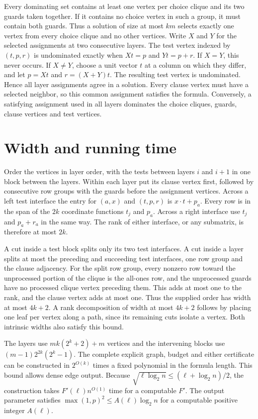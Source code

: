 \documentclass[11pt]{article}
\begin{document}
Every dominating set contains at least one vertex per choice clique and
its two guards taken together. If it contains no choice vertex in such
a group, it must contain both guards. Thus a solution of size at most
$km$ selects exactly one vertex from every choice clique and no other
vertices. Write $X$ and $Y$ for the selected assignments at two consecutive
layers. The test vertex indexed by $(t,p,r)$ is undominated exactly when
$Xt=p$ and $Yt=p+r$. If $X=Y$, this never occurs. If $X\ne Y$, choose a
unit vector $t$ at a column on which they differ, and let $p=Xt$ and
$r=(X+Y)t$. The resulting test vertex is undominated. Hence all layer
assignments agree in a solution. Every clause vertex must have a selected
neighbor, so this common assignment satisfies the formula. Conversely, a
satisfying assignment used in all layers dominates the choice cliques,
guards, clause vertices and test vertices.

\section{Width and running time}

Order the vertices in layer order, with the tests between layers $i$ and
$i+1$ in one block between the layers. Within each layer put its clause
vertex first, followed by consecutive row groups with the guards before
the assignment vertices. Across a left test interface the entry for
$(a,x)$ and $(t,p,r)$ is $x\cdot t+p_a$. Every row is in the span of the
$2k$ coordinate functions $t_j$ and $p_a$. Across a right interface use
$t_j$ and $p_a+r_a$ in the same way. The rank of either interface, or any
submatrix, is therefore at most $2k$.

A cut inside a test block splits only its two test interfaces. A cut
inside a layer splits at most the preceding and succeeding test interfaces,
one row group and the clause adjacency. For the split row group, every
nonzero row toward the unprocessed portion of the clique is the all-ones
row, and the unprocessed guards have no processed clique vertex preceding
them. This adds at most one to the rank, and the clause vertex adds at most
one. Thus the supplied order has width at most $4k+2$. A rank decomposition
of width at most $4k+2$ follows by placing one leaf per vertex along a
path, since its remaining cuts isolate a vertex. Both intrinsic widths
also satisfy this bound.

The layers use $mk(2^k+2)+m$ vertices and the intervening blocks use
$(m-1)2^{2k}(2^k-1)$. The complete explicit graph, budget and either
certificate can be constructed in $2^{O(k)}$ times a fixed polynomial in
the formula length. This bound allows dense edge output. Because
$\sqrt{\ell\log_2 n}\le(\ell+\log_2 n)/2$, the construction takes
$F'(\ell)n^{O(1)}$ time for a computable $F'$. The output parameter
satisfies $\max(1,p)^2\le A(\ell)\log_2 n$ for a computable positive
integer $A(\ell)$.
\end{document}
